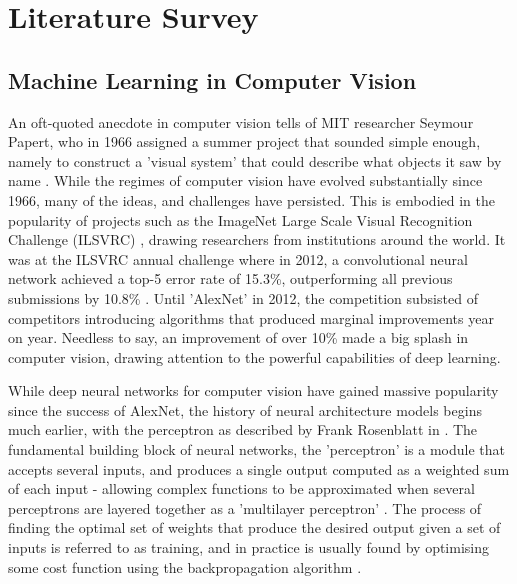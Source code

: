 \documentclass[openany]{book}
\begin{document}
\chapter{Literature Survey}

\section{Machine Learning in Computer Vision}

An oft-quoted anecdote in computer vision tells of MIT researcher Seymour Papert, who in 1966 assigned a summer project that sounded simple enough, namely to construct a 'visual system' that could describe what objects it saw by name \cite{papert1966vision}. While the regimes of computer vision have evolved substantially since 1966, many of the ideas, and challenges have persisted. This is embodied in the popularity of projects such as the ImageNet Large Scale Visual Recognition Challenge (ILSVRC) \cite{ilsvrc}, drawing researchers from institutions around the world. It was at the ILSVRC annual challenge where in 2012, a convolutional neural network achieved a top-5 error rate of 15.3\%, outperforming all previous submissions by 10.8\% \cite{krizhevsky2012alexnet}. Until 'AlexNet' in 2012, the competition subsisted of competitors introducing algorithms that produced marginal improvements year on year. Needless to say, an improvement of over 10\% made a big splash in computer vision, drawing attention to the powerful capabilities of deep learning.

While deep neural networks for computer vision have gained massive popularity since the success of AlexNet, the history of neural architecture models begins much earlier, with the perceptron as described by Frank Rosenblatt in \cite{rosenblatt1959neurodynamics}. The fundamental building block of neural networks, the 'perceptron' is a module that accepts several inputs, and produces a single output computed as a weighted sum of each input - allowing complex functions to be approximated when several perceptrons are layered together as a 'multilayer perceptron' \cite{minsky1969perceptrons}. The process of finding the optimal set of weights that produce the desired output given a set of inputs is referred to as training, and in practice is usually found by optimising some cost function using the backpropagation algorithm \cite{rumelhart1986backprop}. 
\end{document}
